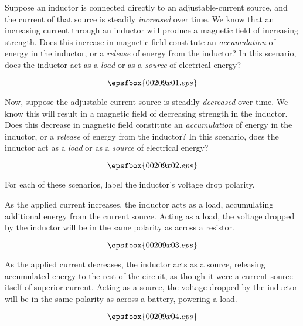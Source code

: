 

Suppose an inductor is connected directly to an adjustable-current source, and the current of that source is steadily {\it increased} over time.  We know that an increasing current through an inductor will produce a magnetic field of increasing strength.  Does this increase in magnetic field constitute an {\it accumulation} of energy in the inductor, or a {\it release} of energy from the inductor?  In this scenario, does the inductor act as a {\it load} or as a {\it source} of electrical energy?

$$\epsfbox{00209x01.eps}$$

Now, suppose the adjustable current source is steadily {\it decreased} over time.  We know this will result in a magnetic field of decreasing strength in the inductor.  Does this decrease in magnetic field constitute an {\it accumulation} of energy in the inductor, or a {\it release} of energy from the inductor?  In this scenario, does the inductor act as a {\it load} or as a {\it source} of electrical energy?

$$\epsfbox{00209x02.eps}$$

For each of these scenarios, label the inductor's voltage drop polarity.







As the applied current increases, the inductor acts as a load, accumulating additional energy from the current source.  Acting as a load, the voltage dropped by the inductor will be in the same polarity as across a resistor.

$$\epsfbox{00209x03.eps}$$

As the applied current decreases, the inductor acts as a source, releasing accumulated energy to the rest of the circuit, as though it were a current source itself of superior current.  Acting as a source, the voltage dropped by the inductor will be in the same polarity as across a battery, powering a load.

$$\epsfbox{00209x04.eps}$$






